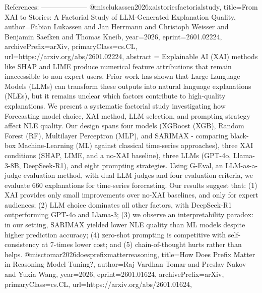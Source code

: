        References:
        --------------------
        @misc{lukassen2026xaistoriesfactorialstudy,
      title={From XAI to Stories: A Factorial Study of LLM-Generated Explanation Quality}, 
      author={Fabian Lukassen and Jan Herrmann and Christoph Weisser and Benjamin Saefken and Thomas Kneib},
      year={2026},
      eprint={2601.02224},
      archivePrefix={arXiv},
      primaryClass={cs.CL},
      url={https://arxiv.org/abs/2601.02224},
      abstract = {Explainable AI (XAI) methods like SHAP and LIME produce numerical feature attributions that remain inaccessible to non expert users. Prior work has shown that Large Language Models (LLMs) can transform these outputs into natural language explanations (NLEs), but it remains unclear which factors contribute to high-quality explanations. We present a systematic factorial study investigating how Forecasting model choice, XAI method, LLM selection, and prompting strategy affect NLE quality. Our design spans four models (XGBoost (XGB), Random Forest (RF), Multilayer Perceptron (MLP), and SARIMAX - comparing black-box Machine-Learning (ML) against classical time-series approaches), three XAI conditions (SHAP, LIME, and a no-XAI baseline), three LLMs (GPT-4o, Llama-3-8B, DeepSeek-R1), and eight prompting strategies. Using G-Eval, an LLM-as-a-judge evaluation method, with dual LLM judges and four evaluation criteria, we evaluate 660 explanations for time-series forecasting. Our results suggest that: (1) XAI provides only small improvements over no-XAI baselines, and only for expert audiences; (2) LLM choice dominates all other factors, with DeepSeek-R1 outperforming GPT-4o and Llama-3; (3) we observe an interpretability paradox: in our setting, SARIMAX yielded lower NLE quality than ML models despite higher prediction accuracy; (4) zero-shot prompting is competitive with self-consistency at 7-times lower cost; and (5) chain-of-thought hurts rather than helps.}
}@misc{tomar2026doesprefixmatterreasoning,
      title={How Does Prefix Matter in Reasoning Model Tuning?}, 
      author={Raj Vardhan Tomar and Preslav Nakov and Yuxia Wang},
      year={2026},
      eprint={2601.01624},
      archivePrefix={arXiv},
      primaryClass={cs.CL},
      url={https://arxiv.org/abs/2601.01624},
}
